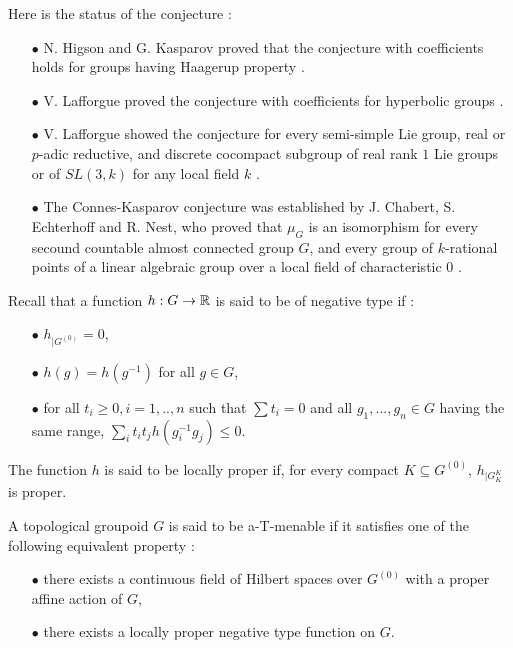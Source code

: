 Here is the status of the conjecture :
\begin{itemize}
\item[$\bullet$] N. Higson and G. Kasparov proved that the conjecture with coefficients holds for groups having Haagerup property \cite{higsonkasparov}. 
\item[$\bullet$] V. Lafforgue proved the conjecture with coefficients for hyperbolic groups \cite{lafforgue2012conjecture}.
\item[$\bullet$] V. Lafforgue showed the conjecture for every semi-simple Lie group, real or $p$-adic reductive, and discrete cocompact subgroup of real rank $1$ Lie groups or of $SL(3,k)$ for any local field $k$ \cite{lafforgueT}. 
\item[$\bullet$] The Connes-Kasparov conjecture was established by J. Chabert, S. Echterhoff and R. Nest, who proved that $\mu_{G}$ is an isomorphism for every secound countable almost connected group $G$, and every group of $k$-rational points of a linear algebraic group over a local field of characteristic $0$ \cite{chabertEN}.\\
\end{itemize}

Recall that a function $h : G\rightarrow \mathbb R$ is said to be of negative type if :
\begin{itemize}
\item[$\bullet$] $h_{|G^{(0)}}=0$,
\item[$\bullet$] $h(g)=h(g^{-1})$ for all $g\in G$,
\item[$\bullet$] for all $t_i\geq 0, i=1,..,n$ such that $\sum t_i=0$ and all $g_1,...,g_n\in G$ having the same range, $\sum_i t_i t_j h(g_i^{-1} g_j )\leq 0$.
\end{itemize}
The function $h$ is said to be locally proper if, for every compact $K \subseteq G^{(0)}$, $h_{|G_K^K}$ is proper.\\

\begin{definition}
A topological groupoid $G$ is said to be a-T-menable if it satisfies one of the following equivalent property :
\begin{itemize}
\item[$\bullet$] there exists a continuous field of Hilbert spaces over $G^{(0)}$ with a proper affine action of $G$,
\item[$\bullet$] there exists a locally proper negative type function on $G$.
\end{itemize} 
\end{definition}

